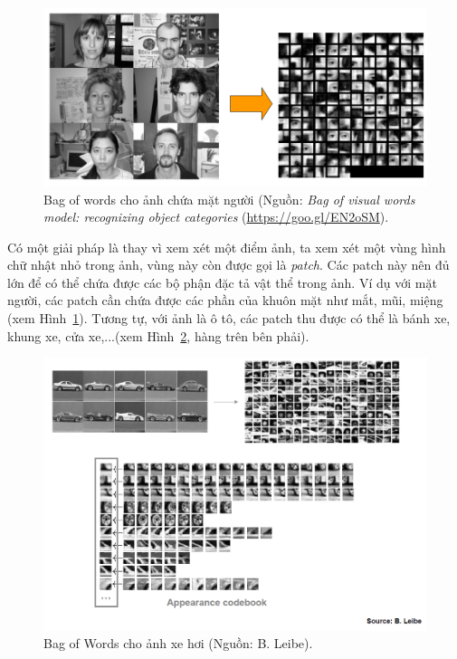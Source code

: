 \begin{figure}[t]
\centering
\includegraphics[width = \textwidth]{Chapters/01_Overview/11_featureengineering/bow_face.png}
\caption[]{Bag of words cho ảnh chứa mặt người (Nguồn: \textit{Bag of
visual words model: recognizing object categories}
(\url{https://goo.gl/EN2oSM}).}
\label{fig:11_2}
\end{figure}

Có một giải pháp là thay vì xem xét một điểm ảnh, ta xem xét một vùng hình chữ
nhật nhỏ trong ảnh, vùng này còn được gọi là \textit{patch}. Các patch này nên
đủ lớn để có thể chứa được các bộ phận đặc tả vật thể trong ảnh. Ví dụ với mặt
người, các patch cần chứa được các phần của khuôn mặt như mắt, mũi, miệng (xem
Hình~\ref{fig:11_2}). Tương tự, với ảnh là ô tô, các patch thu được có thể là
bánh xe, khung xe, cửa xe,...(xem Hình~\ref{fig:11_3}, hàng trên bên phải).
\begin{figure}[t]
\centering
\includegraphics[width = \textwidth]{Chapters/01_Overview/11_featureengineering/bow_car.png}
\caption[]{Bag of Words cho ảnh xe hơi (Nguồn: B. Leibe).}
\label{fig:11_3}
\end{figure}

